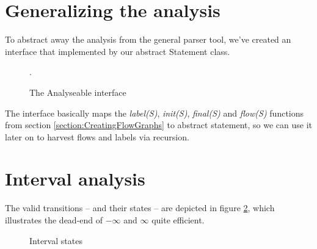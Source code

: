 \section{Generalizing the analysis}
To abstract away the analysis from the general parser tool, we've created an interface that implemented by our abstract Statement class.
\begin{figure}
\centering
{}
\caption{The Analyseable interface}
\label{fig:analysable_basic_definition}.
\end{figure}The interface basically maps the \textit{label(S)}, \textit{init(S)}, \textit{final(S)} and \textit{flow(S)} functions from section \ref{section:CreatingFlowGraphs} to abstract statement, so we can use it later on to harvest flows and labels via recursion.

\section{Interval analysis}

The valid transitions -- and their states -- are depicted in figure \ref{figure:interval_states}, which illustrates the dead-end of $-\infty$ and $\infty$ quite efficient.
\begin{figure}
\centering
\caption{Interval states}
\label{figure:interval_states}
\end{figure}
